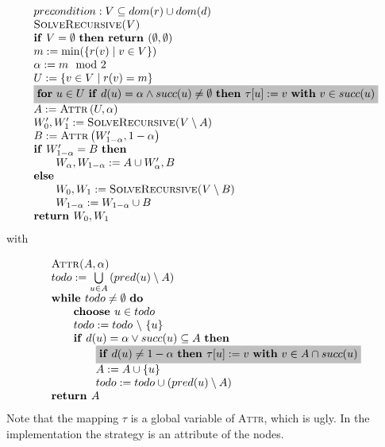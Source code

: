 \documentclass{article}
\begin{document}
\begin{equation*}
\begin{array}{l}
precondition: V \subseteq dom(r) \cup dom(d) \\
\text{\textsc{SolveRecursive(}}V\text{\textsc{)}} \\ 
\text{\textbf{if} }V=\emptyset \text{ \textbf{then return }}(\emptyset
,\emptyset ) \\ 
m:=\min (\{r(v)\mid v\in V\}) \\ 
\alpha :=m \mod 2 \\ 
U:=\{v\in V\mid r(v)=m\} \\ 
\colorbox{lightgray}{$
\text{\textbf{for} }u\in U\text{ \textbf{if} }d(u)=\alpha \wedge succ(u)\neq
\emptyset \text{ \textbf{then }}\tau \lbrack u]:=v\text{ \textbf{with} }v\in
succ(u) $}\\ 
A:=\text{\textsc{Attr}}\left( U,\alpha \right)  \\ 
W_{0}^{\prime },W_{1}^{\prime }:=\text{\textsc{SolveRecursive(}}V\setminus A%
\text{)} \\ 
B:=\text{\textsc{Attr}}\left( W_{1-\alpha }^{\prime },1-\alpha \right)  \\ 
\text{\textbf{if} }W_{1-\alpha }^{\prime }=B\text{ \textbf{then}} \\ 
\qquad W_{\alpha },W_{1-\alpha }:=A\cup W_{\alpha }^{\prime },B \\ 
\text{\textbf{else}} \\ 
\qquad W_{0},W_{1}:=\text{\textsc{SolveRecursive(}}V\setminus B\text{)} \\ 
\qquad W_{1-\alpha }:=W_{1-\alpha }\cup B \\ 
\text{\textbf{return }}W_{0},W_{1}
\end{array}
\end{equation*}
with

\begin{equation*}
\begin{array}{l}
\text{\textsc{Attr(}}A,\alpha \text{\textsc{)}} \\ 
todo:=\bigcup\limits_{u\in A}\left( pred(u)\setminus A\right)  \\ 
\text{\textbf{while }}todo\neq \emptyset \text{ \textbf{do}} \\ 
\qquad \text{\textbf{choose }}u\in todo \\ 
\qquad todo:=todo\ \backslash \ \{u\} \\ 
\qquad \text{\textbf{if} }d(u) = \alpha \vee succ(u)\subseteq A\text{ \textbf{then}} \\ 
\qquad \qquad \colorbox{lightgray}{$%
\text{\textbf{if} }d(u)\neq 1 - \alpha \text{ \textbf{then }}\tau
\lbrack u]:=v\text{ \textbf{with} }v\in A\cap succ(u) $}\\ 
\qquad \qquad A:=A\cup \{u\} \\ 
\qquad \qquad todo:=todo\cup \left( pred(u)\setminus A\right)  \\ 
\text{\textbf{return }}A%
\end{array}%
\end{equation*}%
Note that the mapping $\tau$ is a global variable of \textsc{Attr}, which is ugly.
In the implementation the strategy is an attribute of the nodes.
\end{document}

